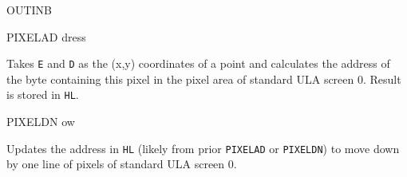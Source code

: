 \begin{basedescript}{
	\desclabelstyle{\multilinelabel}
	\desclabelwidth{3cm}}
\begin{DetailItem}{OUTINB}{\DetailItemZXN}
		\begin{DetailTiming}
		\end{DetailTiming}

	\end{DetailItem}

	\pagebreak


	\begin{DetailItem}{PIXELAD}{\DetailItemZXN}
		{ dress}
		{\SymPIXELAD}

		Takes {\tt E} and {\tt D} as the (x,y) coordinates of a point and calculates the address of the byte containing this pixel in the pixel area of standard ULA screen 0. Result is stored in {\tt HL}.

		\begin{DetailEffects}
			\FlagsPIXELAD
		\end{DetailEffects}
				
		\begin{DetailTiming}
			\DetailTime{2}{8}
		\end{DetailTiming}

	\end{DetailItem}


	\begin{DetailItem}{PIXELDN}{\DetailItemZXN}
		{ ow\IH{N}}
		{\SymPIXELDN}

		Updates the address in {\tt HL} (likely from prior {\tt PIXELAD} or {\tt PIXELDN}) to move down by one line of pixels of standard ULA screen 0.


\end{DetailItem}
\end{basedescript}
